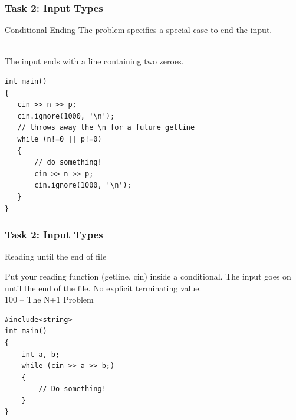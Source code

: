\documentclass{beamer}
\begin{document}
\begin{frame}[fragile]
  \frametitle{Task 2: Input Types}
  \begin{block}{Conditional Ending}
    The problem specifies a special case to end the input.
  \end{block}

  \bigskip

  \\
  The input ends with a line containing two zeroes.
  
{\smaller
\begin{verbatim}
int main()
{
   cin >> n >> p;
   cin.ignore(1000, '\n'); 
   // throws away the \n for a future getline
   while (n!=0 || p!=0)
   {
       // do something!
       cin >> n >> p;               
       cin.ignore(1000, '\n');
   }
}
\end{verbatim}}
\end{frame}

\begin{frame}[fragile]
  \frametitle{Task 2: Input Types}
  \begin{block}{Reading until the end of file}

    Put your reading function (getline, cin) inside a conditional.
    The input goes on until the end of the file. No explicit
    terminating value.\\  100 -- The N+1 Problem
  \end{block}
{\smaller
\begin{verbatim}
#include<string>
int main()
{
    int a, b;
    while (cin >> a >> b;)
    {
        // Do something!
    }
}
\end{verbatim}
}
\end{frame}
\end{document}
